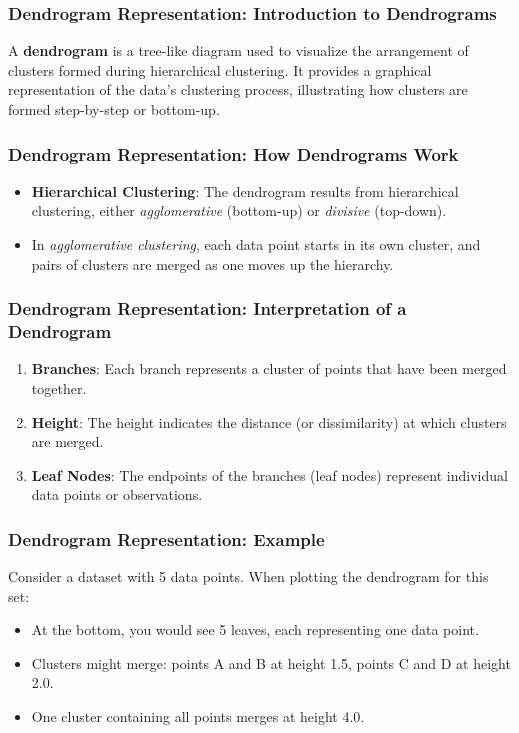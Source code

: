 \documentclass{beamer}
\begin{document}
\begin{frame}[fragile]
    \frametitle{Dendrogram Representation: Introduction to Dendrograms}
    A \textbf{dendrogram} is a tree-like diagram used to visualize the arrangement of clusters formed during hierarchical clustering. 
    It provides a graphical representation of the data's clustering process, illustrating how clusters are formed step-by-step or bottom-up.
\end{frame}

\begin{frame}[fragile]
    \frametitle{Dendrogram Representation: How Dendrograms Work}
    \begin{itemize}
        \item \textbf{Hierarchical Clustering}: The dendrogram results from hierarchical clustering, either \textit{agglomerative} (bottom-up) or \textit{divisive} (top-down).
        \item In \textit{agglomerative clustering}, each data point starts in its own cluster, and pairs of clusters are merged as one moves up the hierarchy.
    \end{itemize}
\end{frame}

\begin{frame}[fragile]
    \frametitle{Dendrogram Representation: Interpretation of a Dendrogram}
    \begin{enumerate}
        \item \textbf{Branches}: Each branch represents a cluster of points that have been merged together.
        \item \textbf{Height}: The height indicates the distance (or dissimilarity) at which clusters are merged.
        \item \textbf{Leaf Nodes}: The endpoints of the branches (leaf nodes) represent individual data points or observations.
    \end{enumerate}
\end{frame}

\begin{frame}[fragile]
    \frametitle{Dendrogram Representation: Example}
    Consider a dataset with 5 data points. When plotting the dendrogram for this set:
    \begin{itemize}
        \item At the bottom, you would see 5 leaves, each representing one data point.
        \item Clusters might merge: points A and B at height 1.5, points C and D at height 2.0.
        \item One cluster containing all points merges at height 4.0.
    \end{itemize}
\end{frame}
\end{document}
